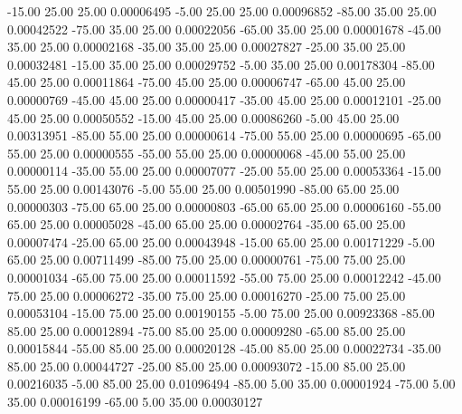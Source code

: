     -15.00     25.00     25.00     0.00006495
     -5.00     25.00     25.00     0.00096852
    -85.00     35.00     25.00     0.00042522
    -75.00     35.00     25.00     0.00022056
    -65.00     35.00     25.00     0.00001678
    -45.00     35.00     25.00     0.00002168
    -35.00     35.00     25.00     0.00027827
    -25.00     35.00     25.00     0.00032481
    -15.00     35.00     25.00     0.00029752
     -5.00     35.00     25.00     0.00178304
    -85.00     45.00     25.00     0.00011864
    -75.00     45.00     25.00     0.00006747
    -65.00     45.00     25.00     0.00000769
    -45.00     45.00     25.00     0.00000417
    -35.00     45.00     25.00     0.00012101
    -25.00     45.00     25.00     0.00050552
    -15.00     45.00     25.00     0.00086260
     -5.00     45.00     25.00     0.00313951
    -85.00     55.00     25.00     0.00000614
    -75.00     55.00     25.00     0.00000695
    -65.00     55.00     25.00     0.00000555
    -55.00     55.00     25.00     0.00000068
    -45.00     55.00     25.00     0.00000114
    -35.00     55.00     25.00     0.00007077
    -25.00     55.00     25.00     0.00053364
    -15.00     55.00     25.00     0.00143076
     -5.00     55.00     25.00     0.00501990
    -85.00     65.00     25.00     0.00000303
    -75.00     65.00     25.00     0.00000803
    -65.00     65.00     25.00     0.00006160
    -55.00     65.00     25.00     0.00005028
    -45.00     65.00     25.00     0.00002764
    -35.00     65.00     25.00     0.00007474
    -25.00     65.00     25.00     0.00043948
    -15.00     65.00     25.00     0.00171229
     -5.00     65.00     25.00     0.00711499
    -85.00     75.00     25.00     0.00000761
    -75.00     75.00     25.00     0.00001034
    -65.00     75.00     25.00     0.00011592
    -55.00     75.00     25.00     0.00012242
    -45.00     75.00     25.00     0.00006272
    -35.00     75.00     25.00     0.00016270
    -25.00     75.00     25.00     0.00053104
    -15.00     75.00     25.00     0.00190155
     -5.00     75.00     25.00     0.00923368
    -85.00     85.00     25.00     0.00012894
    -75.00     85.00     25.00     0.00009280
    -65.00     85.00     25.00     0.00015844
    -55.00     85.00     25.00     0.00020128
    -45.00     85.00     25.00     0.00022734
    -35.00     85.00     25.00     0.00044727
    -25.00     85.00     25.00     0.00093072
    -15.00     85.00     25.00     0.00216035
     -5.00     85.00     25.00     0.01096494
    -85.00      5.00     35.00     0.00001924
    -75.00      5.00     35.00     0.00016199
    -65.00      5.00     35.00     0.00030127
